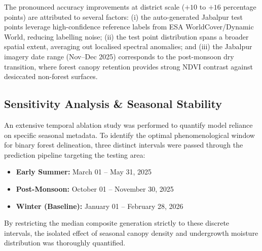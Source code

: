 \documentclass[12pt, a4paper, twocolumn]{article}
\begin{document}
\begin{table}[H]
\centering
\caption{Accuracy comparison across validation scales.}
\label{tab:scale_comparison}
\end{table}

The pronounced accuracy improvements at district scale ($+10$ to $+16$ percentage points) are attributed to several factors: (i) the auto-generated Jabalpur test points leverage high-confidence reference labels from ESA WorldCover/Dynamic World, reducing labelling noise; (ii) the test point distribution spans a broader spatial extent, averaging out localised spectral anomalies; and (iii) the Jabalpur imagery date range (Nov--Dec 2025) corresponds to the post-monsoon dry transition, where forest canopy retention provides strong NDVI contrast against desiccated non-forest surfaces.

\subsection{Sensitivity Analysis \& Seasonal Stability}

An extensive temporal ablation study was performed to quantify model reliance on specific seasonal metadata. To identify the optimal phenomenological window for binary forest delineation, three distinct intervals were passed through the prediction pipeline targeting the testing area:

\begin{itemize}
    \item \textbf{Early Summer:} March 01 -- May 31, 2025
    \item \textbf{Post-Monsoon:} October 01 -- November 30, 2025
    \item \textbf{Winter (Baseline):} January 01 -- February 28, 2026
\end{itemize}

By restricting the median composite generation strictly to these discrete intervals, the isolated effect of seasonal canopy density and undergrowth moisture distribution was thoroughly quantified.
\end{document}
